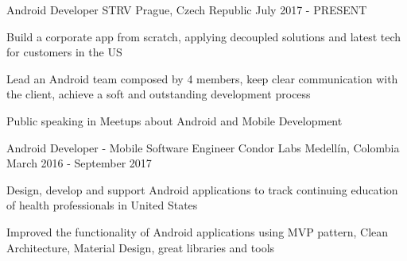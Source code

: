 

\begin{cventries}

  \cventry
    {Android Developer}
    {STRV}
    {Prague, Czech Republic}
    {July 2017 - PRESENT}
    {
      \begin{cvitems}
        \item {Build a corporate app from scratch, applying decoupled solutions and latest tech for customers in the US}
        \item {Lead an Android team composed by 4 members, keep clear communication with the client, achieve a soft and outstanding
               development process}
        \item {Public speaking in Meetups about Android and Mobile Development}
      \end{cvitems}
      \begin{cvsubentries}
      \end{cvsubentries}
    }
  \cventry
    {Android Developer - Mobile Software Engineer}
    {Condor Labs}
    {Medellín, Colombia}
    {March 2016 - September 2017}
    {
      \begin{cvitems}
        \item {Design, develop and support Android applications to track continuing education of
               health professionals in United States}
        \item {Improved the functionality of Android applications using MVP pattern, Clean
               Architecture, Material Design, great libraries and tools}
      \end{cvitems}
      \begin{cvsubentries}
\end{cvsubentries}}
\end{cventries}
